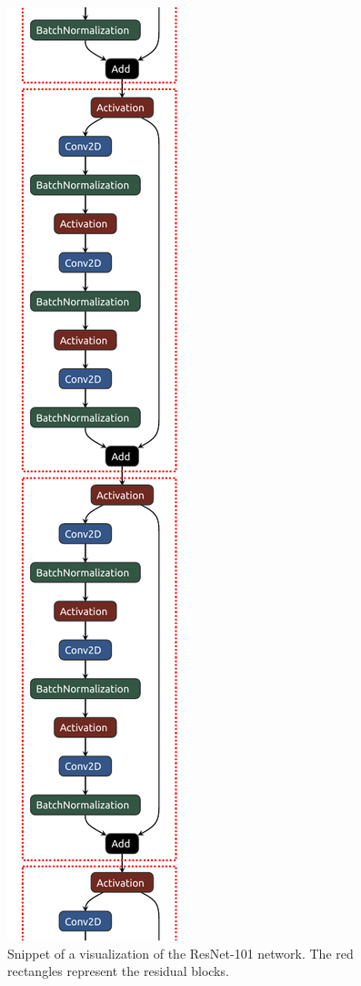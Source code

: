 \begin{figure}[hbtp]
    \centering
    \includegraphics[angle=90, width=\linewidth]{assets/resnet101_residual_blocks.pdf}
    \caption{
    Snippet of a visualization of the ResNet-101 network.
    The red rectangles represent the residual blocks.
    }
    \label{fig:resnet101_residual_blocks}
\end{figure}

